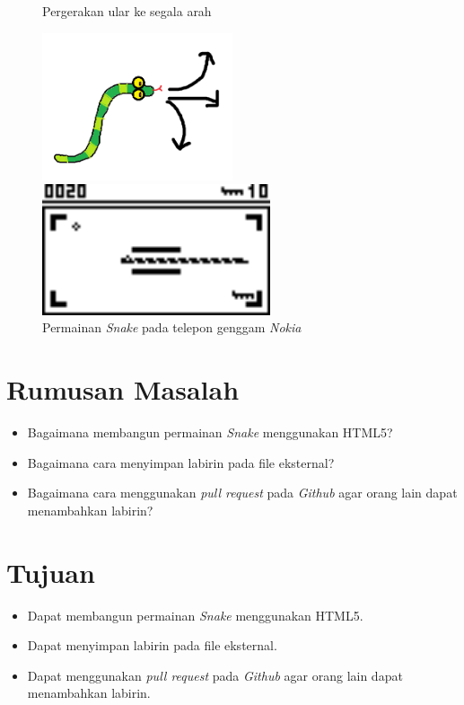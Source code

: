 \documentclass[a4paper,twoside]{article}
\begin{document}
\begin{figure}[H]
	\centering
	\begin{minipage}{.5\textwidth}
		\caption{Pergerakan ular ke segala arah}
		\centering
		\includegraphics[width=0.5\textwidth]{snake.png}
	\end{minipage}%
	\begin{minipage}{.5\textwidth}
		\caption{Permainan \textit{Snake} pada telepon genggam \textit{Nokia}}
		\centering
		\includegraphics[width=0.6\textwidth]{nokiaSnake.png}
	\end{minipage}
\end{figure}

\section{Rumusan Masalah}
\begin{itemize}
	\item Bagaimana membangun permainan \textit{Snake} menggunakan HTML5? 
	\item Bagaimana cara menyimpan labirin pada file eksternal?
	\item Bagaimana cara menggunakan \textit{pull request} pada \textit{Github} agar orang lain dapat menambahkan labirin?
\end{itemize}

\section{Tujuan}
\begin{itemize}
	\item Dapat membangun permainan \textit{Snake} menggunakan HTML5. 
	\item Dapat menyimpan labirin pada file eksternal.
	\item Dapat menggunakan \textit{pull request} pada \textit{Github} agar orang lain dapat menambahkan labirin.
\end{itemize}
\end{document}
